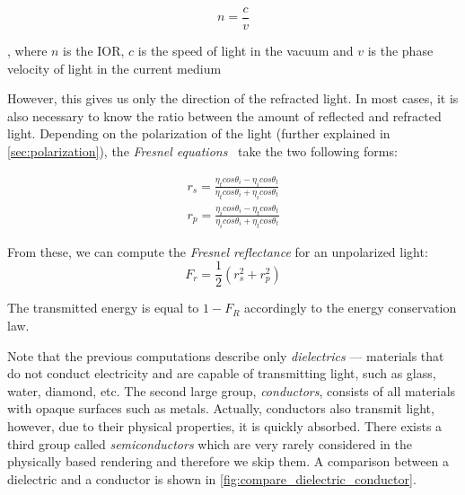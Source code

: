 \begin{equation}
n=\frac{c}{v}
\end{equation}

, where $n$ is the IOR, $c$ is the speed of light in the vacuum and $v$ is the phase velocity of light in the current medium

However, this gives us only the direction of the refracted light. In most cases, it is also necessary to know the ratio between the amount of reflected and refracted light. Depending on the polarization of the light (further explained in \autoref{sec:polarization}), the \emph{Fresnel equations}~\cite{pharr2016physically} take the two following forms:

\begin{align*}
r_s = \frac{\eta_t cos\theta_i - \eta_i cos\theta_t}{\eta_t cos\theta_i + \eta_i cos\theta_t}\\
r_p = \frac{\eta_i cos\theta_i - \eta_t cos\theta_t}{\eta_i cos\theta_i + \eta_t cos\theta_t} 
\end{align*}

From these, we can compute the \emph{Fresnel reflectance} for an unpolarized light:
\begin{equation}
F_r=\frac{1}{2}(r_s^2 + r_p^2)
\end{equation}

The transmitted energy is equal to $1-F_R$ accordingly to the energy conservation law.

Note that the previous computations describe only \emph{dielectrics} --- materials that do not conduct electricity and are capable of transmitting light, such as glass, water, diamond, etc. The second large group, \emph{conductors}, consists of all materials with opaque surfaces such as metals. Actually, conductors also transmit light, however, due to their physical properties, it is quickly absorbed. There exists a third group called \emph{semiconductors} which are very rarely considered in the physically based rendering and therefore we skip them. A comparison between a dielectric and a conductor is shown in \autoref{fig:compare_dielectric_conductor}.

